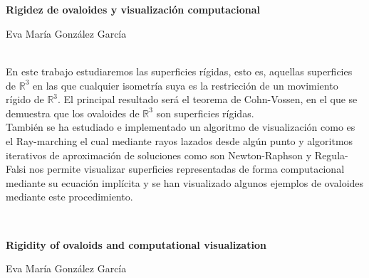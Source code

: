 \chapter*{}






\cleardoublepage
\thispagestyle{empty}

\begin{center}
{\large\bfseries Rigidez de ovaloides y visualización computacional}\\
\end{center}
\begin{center}
Eva María González García\\
\end{center}


\vspace{0.7cm}
\\

En este trabajo estudiaremos las superficies rígidas, esto es, aquellas superficies de $\mathbb{R}^3$ en las que cualquier isometría suya es la restricción de un movimiento rígido de $\mathbb{R}^3$. El principal resultado será el teorema de Cohn-Vossen, en el que se demuestra que los ovaloides de $\mathbb{R}^3$ son superficies rígidas.
${ }$\\

También se ha estudiado e implementado un algoritmo de visualización como es el Ray-marching el cual mediante rayos lazados desde algún punto y algoritmos iterativos de aproximación de soluciones como son Newton-Raphson y Regula-Falsi nos permite visualizar superficies representadas de forma computacional mediante su ecuación implícita y se han visualizado algunos ejemplos de ovaloides mediante este procedimiento.


\vspace{0.7cm}
\\
\cleardoublepage


\thispagestyle{empty}


\begin{center}
{\large\bfseries Rigidity of ovaloids and computational visualization}\\
\end{center}
\begin{center}
Eva María González García\\
\end{center}

